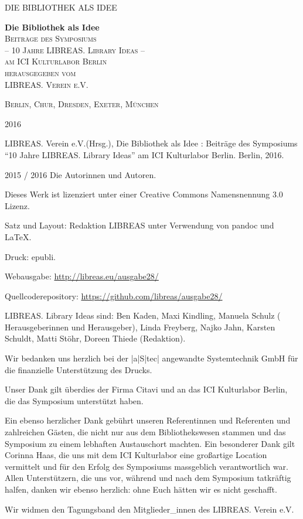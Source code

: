 \documentclass[10.5pt,a5paper,twoside]{memoir}
\newlength\drop
\newcommand*\titleM{\begingroup%
\setlength\drop{0.08\textheight}
\centering
\vspace*{\drop}
{\Huge\bfseries Die Bibliothek als Idee}\\[\baselineskip]
{\scshape Beiträge des Symposiums \\ -- 10 Jahre LIBREAS. Library Ideas -- \\ am ICI Kulturlabor Berlin}\\[\baselineskip]
\vfill
{\large\scshape {\small herausgegeben vom}\\{\large LIBREAS. Verein e.V.}}\par
\vfill
{\scshape Berlin, Chur, Dresden, Exeter, München}\par
\vfill
{\scshape 2016}\par
\endgroup}
\begin{document}
\frontmatter


\pagestyle{empty}
\begin{flushright}
{\LARGE DIE BIBLIOTHEK ALS IDEE} 
\end{flushright}

\cleartorecto

\pagestyle{empty}
\titleM
\cleartoverso


\begingroup
\footnotesize
\parindent 0pt
\parskip \baselineskip
\vspace*{\fill}

LIBREAS. Verein e.V.(Hrsg.), Die Bibliothek als Idee : Beiträge des Symposiums \enquote{10
Jahre LIBREAS. Library Ideas} am ICI Kulturlabor Berlin. Berlin, 2016.

\textcopyright{}
2015 / 2016 Die Autorinnen und Autoren. 

Dieses Werk ist lizenziert unter einer Creative Commons Namensnennung 3.0 Lizenz.

Satz und Layout: Redaktion LIBREAS unter Verwendung von pandoc und \LaTeX. 

Druck: epubli.

Webausgabe: \url{http://libreas.eu/ausgabe28/}

Quellcoderepository: \url{https://github.com/libreas/ausgabe28/}

LIBREAS. Library Ideas sind: Ben Kaden, Maxi Kindling, Manuela Schulz (
Herausgeberinnen und Herausgeber), Linda Freyberg, Najko Jahn, Karsten
Schuldt, Matti Stöhr, Doreen Thiede (Redaktion).

    \endgroup
\newpage

\begin{flushright} Wir bedanken uns herzlich bei der |a|S|tec| angewandte
Systemtechnik GmbH für die finanzielle Unterstützung des Drucks.

\vspace{10mm}

Unser Dank gilt überdies der Firma Citavi und an das ICI Kulturlabor Berlin,
die das Symposium unterstützt haben.

\vspace{10mm}

Ein ebenso herzlicher Dank gebührt unseren Referentinnen und Referenten und
zahlreichen Gästen, die nicht nur aus dem Bibliothekswesen stammen und das
Symposium zu einem lebhaften Austauschort machten. Ein besonderer Dank gilt
Corinna Haas, die uns mit dem ICI Kulturlabor eine großartige Location
vermittelt und für den Erfolg des Symposiums massgeblich verantwortlich war.
Allen Unterstützern, die uns vor, während und nach dem Symposium tatkräftig
halfen, danken wir ebenso herzlich: ohne Euch hätten wir es nicht geschafft.

\vspace{10mm}

Wir widmen den Tagungsband den Mitglieder\_innen des LIBREAS. Verein e.V.
\end{flushright}
\end{document}
